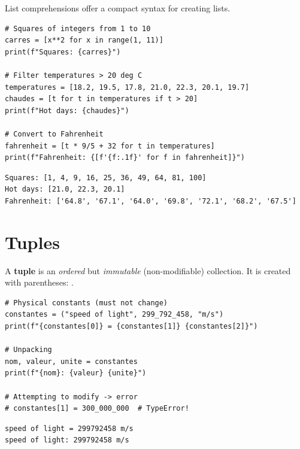 List comprehensions offer a compact syntax for creating lists.

\begin{codeblock}[title=\textbf{Python}]
\begin{verbatim}
# Squares of integers from 1 to 10
carres = [x**2 for x in range(1, 11)]
print(f"Squares: {carres}")

# Filter temperatures > 20 deg C
temperatures = [18.2, 19.5, 17.8, 21.0, 22.3, 20.1, 19.7]
chaudes = [t for t in temperatures if t > 20]
print(f"Hot days: {chaudes}")

# Convert to Fahrenheit
fahrenheit = [t * 9/5 + 32 for t in temperatures]
print(f"Fahrenheit: {[f'{f:.1f}' for f in fahrenheit]}")
\end{verbatim}
\end{codeblock}

\begin{codeoutput}
\begin{verbatim}
Squares: [1, 4, 9, 16, 25, 36, 49, 64, 81, 100]
Hot days: [21.0, 22.3, 20.1]
Fahrenheit: ['64.8', '67.1', '64.0', '69.8', '72.1', '68.2', '67.5']
\end{verbatim}
\end{codeoutput}

\section{Tuples}

\begin{definition}[Tuple]
A \textbf{tuple} is an \emph{ordered} but \emph{immutable}
(non-modifiable) collection. It is created with parentheses: .
\end{definition}

\begin{codeblock}[title=\textbf{Python}]
\begin{verbatim}
# Physical constants (must not change)
constantes = ("speed of light", 299_792_458, "m/s")
print(f"{constantes[0]} = {constantes[1]} {constantes[2]}")

# Unpacking
nom, valeur, unite = constantes
print(f"{nom}: {valeur} {unite}")

# Attempting to modify -> error
# constantes[1] = 300_000_000  # TypeError!
\end{verbatim}
\end{codeblock}

\begin{codeoutput}
\begin{verbatim}
speed of light = 299792458 m/s
speed of light: 299792458 m/s
\end{verbatim}
\end{codeoutput}

